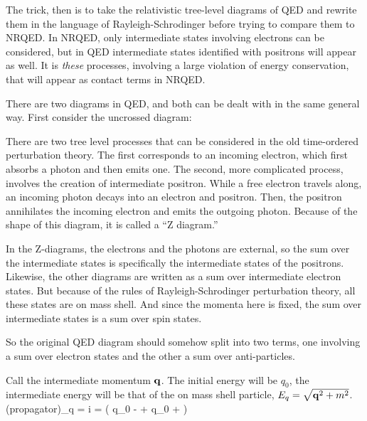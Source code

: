 The trick, then is to take the relativistic tree-level diagrams of QED and rewrite them in the language of  Rayleigh-Schrodinger before trying to compare them to NRQED.  In NRQED, only intermediate states involving electrons can be considered, but in QED intermediate states identified with positrons will appear as well.  It is {\it these} processes, involving a large violation of energy conservation, that will appear as contact terms in NRQED.  

There are two diagrams in QED, and both can be dealt with in the same general way.  First consider the uncrossed diagram:

There are two tree level processes that can be considered in the old time-ordered perturbation theory.  The first corresponds to an incoming electron, which first absorbs a photon and then emits one.  The second, more complicated process, involves the creation of intermediate positron.  While a free electron travels along, an incoming photon decays into an electron and positron.  Then, the positron annihilates the incoming electron and emits the outgoing photon.  Because of the shape of this diagram, it is called a ``Z diagram.''

In the Z-diagrams, the electrons and the photons are external, so the sum over the intermediate states is specifically the intermediate states of the positrons.  Likewise, the other diagrams are written as a sum over intermediate electron states.  But because of the rules of Rayleigh-Schrodinger perturbation theory, all these states are on mass shell.  And since the momenta here is fixed, the sum over intermediate states is a sum over spin states.

So the original QED diagram should somehow split into two terms, one involving a sum over electron states and the other a sum over anti-particles.  

Call the intermediate momentum $\mathbf{q}$.  The initial energy will be $q_0$, the intermediate energy will be that of the on mass shell particle, $E_q = \sqrt{\mathbf{q}^2 + m^2 }$.
\beq
	(propagator)_q = i  
		=  \left(
			  {q_0 -  }
			+   {q_0 +  }
		\right )
\eeq  

